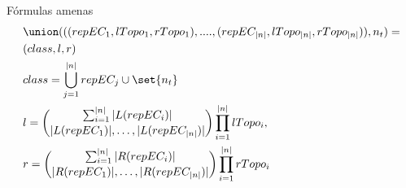\begin{comment}
		\begin{frame}{Intuición de \texttt{unrEqCl}}
		\dificultyLevel{3}
		\begin{itemize}[<+- | alert@+>]
			\item Para calcular las clases de los árboles no relacionados vamos a seguir un razonamiento similar al de calcular la cantidad de clases. 
			\item Descomponemos un subárbol en subproblemas: cada nodo $node$ reutiliza clases de sus hijos.
			\item \textbf{Caso base (hojas)}: solo dos configuraciones posibles, puede estar a la izquierda o la derecha. 
			\item \textbf{Caso recursivo}: combinamos los resultados de los hijos utilizando la función $union$. 
			\item \texttt{union} combina distintas clases de equivalencia, si quieren saber como lo hace pueden leer la tesis $\heartsuit$
		\end{itemize}
	\end{frame}
	
	\item \textbf{Caso recursivo}: para cada combinación \(mix\) de clases hijas,
	\begin{itemize}
		\item Se coloca al nodo a la izquierda y se combinan todos los resultados de sus hijos:  \texttt{union(mix, $node_{left}$)}.
		\item Se coloca al nodo a la derecha y se colocan todos sus hijos a la derecha:  \texttt{union(mix, $node_{left}$)}.
	\end{itemize}
\end{comment}
	
\begin{frame}{Fórmulas amenas}
	\begin{align*}\label{formula:union}
		&\union(((repEC_1, lTopo_1, rTopo_1), ...., (repEC_{|n|}, lTopo_{|n|}, rTopo_{|n|})), n_t) = \\
		&(class,l,r)\\ 
		&class = \bigcup_{j=1}^{|n|} repEC_j \cup \set{n_t} \\
		&l = \binom{\sum_{i=1}^{|n|} |L(repEC_i)|}{|L(repEC_1)|, \ldots, |L(repEC_{|n|})|} \prod_{i=1}^{|n|} lTopo_i, \\ 
		&r=\binom{\sum_{i=1}^{|n|} |R(repEC_i)|}{|R(repEC_1)|, \ldots, |R(repEC_{|n|})|} \prod_{i=1}^{|n|} rTopo_i 
	\end{align*}
\end{frame}

